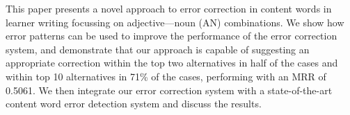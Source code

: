 This paper presents a novel approach to error correction in content words in learner writing focussing on adjective---noun (AN) combinations. We show how error patterns can be used to improve the performance of the error correction system, and demonstrate that our approach is capable of suggesting an appropriate correction within the top two alternatives in half of the cases and within top 10 alternatives in 71\% of the cases, performing with an MRR of 0.5061. We then integrate our error correction system with a state-of-the-art content word error detection system and discuss the results.
